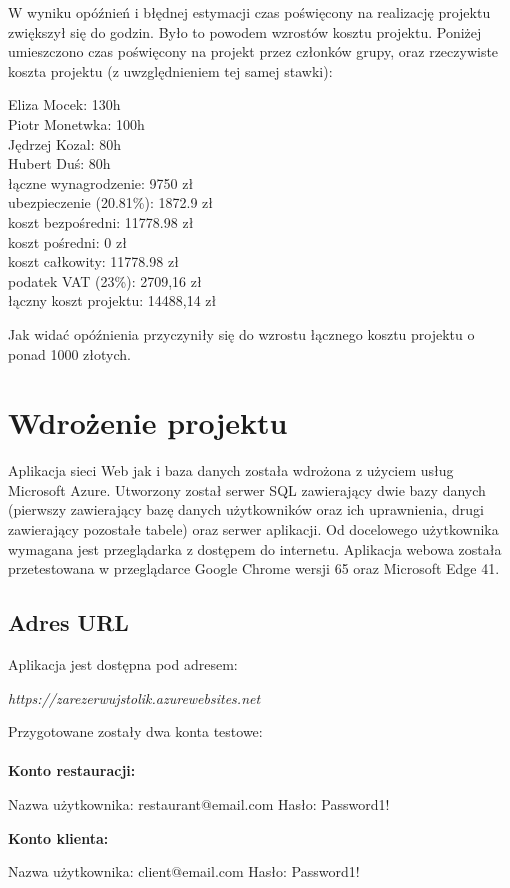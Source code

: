 \documentclass{article}
\newcommand\tab[1][1cm]{\hspace*{#1}}
\begin{document}
W wyniku opóźnień i błędnej estymacji czas poświęcony na realizację projektu zwiększył się do  godzin. Było to powodem wzrostów kosztu projektu. Poniżej umieszczono czas poświęcony na projekt przez członków grupy, oraz rzeczywiste koszta projektu (z uwzględnieniem tej samej stawki):

\hspace*{0.35cm} Eliza Mocek: 130h \\
\tab Piotr Monetwka: 100h \\
\tab Jędrzej Kozal: 80h \\
\tab Hubert Duś: 80h \\

\hspace*{0.35cm} łączne wynagrodzenie: 9750 zł \\
\tab ubezpieczenie (20.81\%): 1872.9 zł \\
\tab koszt bezpośredni: 11778.98 zł \\
\tab koszt pośredni: 0 zł \\
\tab koszt całkowity: 11778.98 zł \\
\tab podatek VAT (23\%): 2709,16 zł \\
\tab łączny koszt projektu: 14488,14 zł

Jak widać opóźnienia przyczyniły się do wzrostu łącznego kosztu projektu o ponad 1000 złotych. 

\section{Wdrożenie projektu}
Aplikacja sieci Web jak i baza danych została wdrożona z użyciem usług Microsoft Azure. Utworzony został serwer SQL zawierający dwie bazy danych (pierwszy zawierający bazę danych użytkowników oraz ich uprawnienia, drugi zawierający pozostałe tabele) oraz serwer aplikacji. Od docelowego użytkownika wymagana jest przeglądarka z dostępem do internetu. Aplikacja webowa została przetestowana w przeglądarce Google Chrome wersji 65 oraz Microsoft Edge 41.
\subsection{Adres URL}
Aplikacja jest dostępna pod adresem:
\begin{center}
\textit{https://zarezerwujstolik.azurewebsites.net}
\end{center}
Przygotowane zostały dwa konta testowe:\\\\
\textbf{Konto restauracji:}
\begin{center}
Nazwa użytkownika: restaurant@email.com Hasło: Password1!
\end{center}
\textbf{Konto klienta:}
\begin{center}
Nazwa użytkownika: client@email.com Hasło: Password1!
\end{center}
\end{document}
